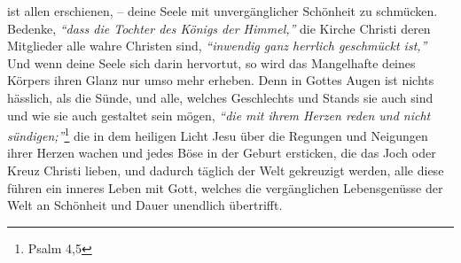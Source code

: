 ist allen erschienen, -- deine Seele mit unvergänglicher Schönheit zu schmücken.
Bedenke, \textit{"`dass die Tochter des Königs der Himmel,"'} die Kirche Christi
 deren
 Mitglieder alle wahre
Christen
sind, \textit{"`inwendig ganz herrlich geschmückt ist,"'}
Und wenn deine Seele sich darin hervortut, so wird das Mangelhafte deines
Körpers ihren Glanz nur umso mehr erheben. Denn in Gottes Augen ist nichts
hässlich, als die Sünde, und alle, welches Geschlechts und Stands
sie auch
sind und wie sie auch gestaltet sein mögen,
\textit{"`die mit ihrem Herzen reden und
nicht sündigen;"'}\footnote{Psalm 4,5}
die in dem heiligen Licht Jesu über die
Regungen und Neigungen ihrer Herzen wachen und jedes Böse in der Geburt
ersticken, die das Joch oder Kreuz Christi  lieben, und dadurch
täglich der Welt
gekreuzigt werden, alle diese führen ein inneres Leben
mit
Gott, welches die
vergänglichen Lebensgenüsse der Welt an Schönheit und Dauer unendlich
übertrifft.


